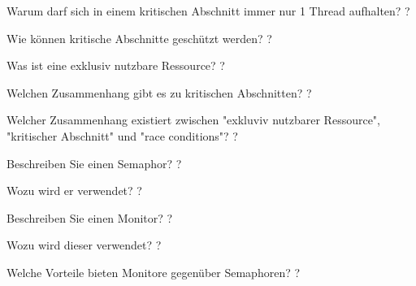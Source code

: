 \documentclass[avery5371]{flashcards}
\begin{document}
\begin{flashcard}{Warum darf sich in einem kritischen Abschnitt immer nur 1 Thread aufhalten?}
    ?
\end{flashcard}

\begin{flashcard}{Wie können kritische Abschnitte geschützt werden?}
    ?
\end{flashcard}

\begin{flashcard}{Was ist eine exklusiv nutzbare Ressource?}
    ?
\end{flashcard}

\begin{flashcard}{Welchen Zusammenhang gibt es zu kritischen Abschnitten?}
    ?
\end{flashcard}

\begin{flashcard}{Welcher Zusammenhang existiert zwischen "exkluviv nutzbarer Ressource", "kritischer Abschnitt" und "race conditions"?}
    ?
\end{flashcard}

\begin{flashcard}[Semaphor]{Beschreiben Sie einen Semaphor?}
    ?
\end{flashcard}

\begin{flashcard}[Semaphor]{Wozu wird er verwendet?}
    ?
\end{flashcard}

\begin{flashcard}{Beschreiben Sie einen Monitor?}
    ?
\end{flashcard}

\begin{flashcard}{Wozu wird dieser verwendet?}
    ?
\end{flashcard}

\begin{flashcard}{Welche Vorteile bieten Monitore gegenüber Semaphoren? }
    ?
\end{flashcard}
\end{document}
